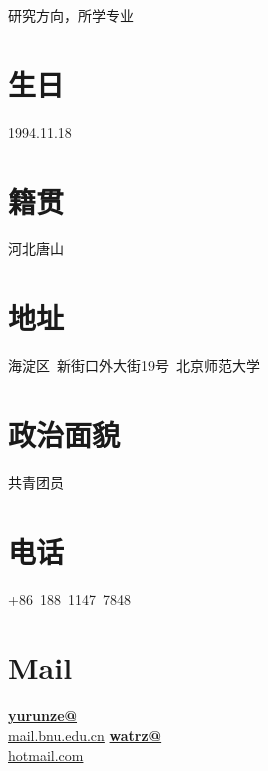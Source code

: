 \documentclass[]{friggeri-cv}
\begin{document}
      {研究方向，所学专业}
      

\begin{aside}
\section{\cuti 生日}
1994.11.18
\section{\cuti 籍贯}
河北唐山
\section{\cuti 地址}
海淀区~新街口外大街19号~北京师范大学
\section{\cuti 政治面貌}
共青团员
\section{\cuti 电话}
+86~188~1147~7848
\section{Mail}
\href{mailto:yurunze@mail.bnu.edu.cn}{\textbf{yurunze@}\\mail.bnu.edu.cn}
\href{mailto:watrz@hotmail.com}{\textbf{watrz@}\\hotmail.com}

\end{aside}
\end{document}
